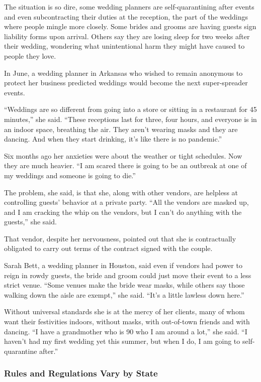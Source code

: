 The situation is so dire, some wedding planners are self-quarantining
after events and even subcontracting their duties at the reception, the
part of the weddings where people mingle more closely. Some brides and
grooms are having guests sign liability forms upon arrival. Others say
they are losing sleep for two weeks after their wedding, wondering what
unintentional harm they might have caused to people they love.

In June, a wedding planner in Arkansas who wished to remain anonymous to
protect her business predicted weddings would become the next
super-spreader events.

``Weddings are so different from going into a store or sitting in a
restaurant for 45 minutes,'' she said. ``These receptions last for
three, four hours, and everyone is in an indoor space, breathing the
air. They aren't wearing masks and they are dancing. And when they start
drinking, it's like there is no pandemic.''

Six months ago her anxieties were about the weather or tight schedules.
Now they are much heavier. ``I am scared there is going to be an
outbreak at one of my weddings and someone is going to die.''

The problem, she said, is that she, along with other vendors, are
helpless at controlling guests' behavior at a private party. ``All the
vendors are masked up, and I am cracking the whip on the vendors, but I
can't do anything with the guests,'' she said.

That vendor, despite her nervousness, pointed out that she is
contractually obligated to carry out terms of the contract signed with
the couple.

Sarah Bett, a wedding planner in Houston, said even if vendors had power
to reign in rowdy guests, the bride and groom could just move their
event to a less strict venue. ``Some venues make the bride wear masks,
while others say those walking down the aisle are exempt,'' she said.
``It's a little lawless down here.''

Without universal standards she is at the mercy of her clients, many of
whom want their festivities indoors, without masks, with out-of-town
friends and with dancing. ``I have a grandmother who is 90 who I am
around a lot,'' she said. ``I haven't had my first wedding yet this
summer, but when I do, I am going to self-quarantine after.''

\hypertarget{rules-and-regulations-vary-by-state}{%
\subsubsection{\texorpdfstring{\textbf{Rules and Regulations Vary by
State}}{Rules and Regulations Vary by State}}\label{rules-and-regulations-vary-by-state}}

